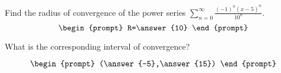 \documentclass{ximera}
\author{Gregory Hartman \and Matthew Carr}
\begin{document}
\begin{exercise}




Find the radius of convergence of the power series $\sum_{n=0}^{\infty}\frac{(-1)^{n}(x-5)^{n}}{10^n}$.
\[
\begin{prompt}
R=\answer{10}
\end{prompt}
\]

What is the corresponding interval of convergence?

\[
\begin{prompt}
(\answer{-5},\answer{15})
\end{prompt}
\]

\end{exercise}
\end{document}
